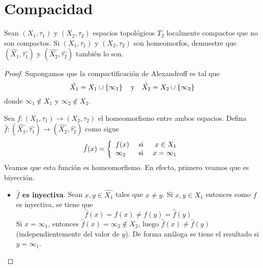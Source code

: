 \documentclass[12pt]{report}
\theoremstyle{largebreak}
\newcommand\cf[3]{\ensuremath{#1:#2\rightarrow#3}}
\begin{document}
    \section{Compacidad}

    \begin{excer}
        Sean $(X_1,\tau_1)$ y $(X_2,\tau_2)$ espacios topológicos $T_2$ localmente compactos que no son compactos. Si $(X_1,\tau_1)$ y $(X_2,\tau_2)$ son homeomorfos, demuestre que $(\hat{X_1},\hat{\tau_1})$ y $(\hat{X_2},\hat{\tau_2})$ también lo son.
    \end{excer}

    \begin{proof}
        Supongamos que la compactificación de Alexandroff es tal que
        \begin{equation*}
            \hat{X_1}=X_1\cup\left\{\infty_1 \right\}\quad\textup{y}\quad\hat{X_2}=X_2\cup\left\{\infty_2 \right\}
        \end{equation*}
        donde $\infty_1\notin X_1$ y $\infty_2\notin X_2$.

        Sea $\cf{f}{(X_1,\tau_1)}{(X_2,\tau_2)}$ el homeomorfismo entre ambos espacios. Defina $\cf{\hat{f}}{(\hat{X_1},\hat{\tau_1})}{(\hat{X_2},\hat{\tau_2})}$ como sigue
        \begin{equation*}
            \hat{f}(x)=\left\{ 
                \begin{array}{lcr}
                    f(x) & \textup{ si } & x\in X_1\\
                    \infty_2 & \textup{ si } & x=\infty_1\\
                \end{array}
            \right.
        \end{equation*}
        Veamos que esta función es homeomorfismo. En efecto, primero veamos que es biyección.
        \begin{itemize}
            \item \textbf{$\hat{f}$ es inyectiva}. Sean $x,y\in \hat{X_1}$ tales que $x\neq y$. Si $x,y\in X_1$ entonces como $f$ es inyectiva, se tiene que
            \begin{equation*}
                \hat{f}(x)=f(x)\neq f(y)=\hat{f}(y)
            \end{equation*}
            Si $x=\infty_1$, entonces $\hat{f}(x)=\infty_2\notin X_2$, luego $\hat{f}(x)\neq \hat{f}(y)$ (independientemente del valor de $y$). De forma análoga se tiene el resultado si $y=\infty_1$.
            

\end{itemize}
\end{proof}
\end{document}
